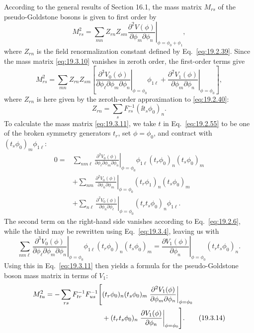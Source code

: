 According to the general results of Section 16.1, the mass matrix $M_{rs}$ of the pseudo-Goldstone bosons is given to first order by
\begin{equation}
M_{rs}^2=\left.\sum_{mn}Z_{rn}Z_{sm}
\frac{\partial^2 V(\phi)}{\partial\phi_m\partial\phi_n}
\right|_{\phi=\phi_0+\phi_1},
\tag{19.3.10}\label{eq:19.3.10}
\end{equation}
where $Z_{rn}$ is the field renormalization constant defined by Eq.~\eqref{eq:19.2.39}. Since the mass matrix \eqref{eq:19.3.10} vanishes in zeroth order, the first-order terms give
\begin{equation}
M_{rs}^2=\sum_{mn}Z_{rn}Z_{sm}
\left[
\left.\frac{\partial^3 V_0(\phi)}
{\partial\phi_\ell\partial\phi_m\partial\phi_n}
\right|_{\phi=\phi_0}\phi_{1\ell}
+\left.\frac{\partial^2 V_1(\phi)}
{\partial\phi_m\partial\phi_n}\right|_{\phi=\phi_0}
\right],
\tag{19.3.11}\label{eq:19.3.11}
\end{equation}
where $Z_{rn}$ is here given by the zeroth-order approximation to \eqref{eq:19.2.40}:
\begin{equation}
Z_{rn}=\sum_s F_{rs}^{-1}(\ii t_s\phi_0)_n.
\tag{19.3.12}\label{eq:19.3.12}
\end{equation}
To calculate the mass matrix \eqref{eq:19.3.11}, we take $t$ in Eq.~\eqref{eq:19.2.55} to be one of the broken symmetry generators $t_r$, set $\phi=\phi_0$, and contract with $(t_s\phi_0)_m\phi_{1\ell}$:
\begin{align*}
0={}&
\left.\sum_{nm\ell}
\frac{\partial^3 V_0(\phi)}
{\partial\phi_\ell\partial\phi_m\partial\phi_n}
\right|_{\phi=\phi_0}
\phi_{1\ell}(t_r\phi_0)_n(t_s\phi_0)_m
\\
&+\left.\sum_{nm}
\frac{\partial^2 V_0(\phi)}
{\partial\phi_n\partial\phi_m}
\right|_{\phi=\phi_0}
(t_r\phi_1)_n(t_s\phi_0)_m
\\
&+\left.\sum_{n\ell}
\frac{\partial^2 V_0(\phi)}
{\partial\phi_n\partial\phi_\ell}
\right|_{\phi=\phi_0}
(t_rt_s\phi_0)_n\phi_{1\ell}.
\end{align*}
The second term on the right-hand side vanishes according to Eq.~\eqref{eq:19.2.6}, while the third may be rewritten using Eq.~\eqref{eq:19.3.4}, leaving us with
\begin{equation}
\left.\sum_{nm\ell}
\frac{\partial^3 V_0(\phi)}
{\partial\phi_\ell\partial\phi_m\partial\phi_n}
\right|_{\phi=\phi_0}
\phi_{1\ell}(t_r\phi_0)_n(t_s\phi_0)_m
=
\left.\frac{\partial V_1(\phi)}{\partial\phi_n}
\right|_{\phi=\phi_0}
(t_rt_s\phi_0)_n.
\tag{19.3.13}\label{eq:19.3.13}
\end{equation}
Using this in Eq.~\eqref{eq:19.3.11} then yields a formula for the pseudo-Goldstone boson mass matrix in terms of $V_1$:
\begin{align}
M_{tu}^2=-\sum_{rs}F_{tr}^{-1}F_{us}^{-1}
\Biggl[
&(t_r\phi_0)_n(t_s\phi_0)_m
\left.\frac{\partial^2 V_1(\phi)}
{\partial\phi_m\partial\phi_n}\right|_{\phi=\phi_0}
\notag\\
&+(t_rt_s\phi_0)_n
\left.\frac{\partial V_1(\phi)}{\partial\phi_n}
\right|_{\phi=\phi_0}
\Biggr].
\tag{19.3.14}\label{eq:19.3.14}
\end{align}

